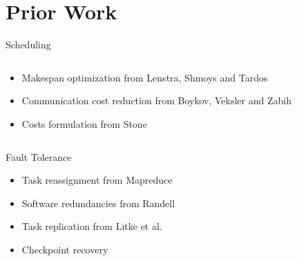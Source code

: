 \documentclass{beamer}
\begin{document}
\section{Prior Work}

\begin{frame}{Scheduling}
\begin{columns}
\begin{column}{6cm}
\begin{itemize}
	\item Makespan optimization from Lenstra, Shmoys and Tardos \cite{len87}
	\item Communication cost reduction from Boykov, Veksler and Zabih \cite{boy01}
	\item Costs formulation from Stone \cite{sto77}
\end{itemize}
\end{column}
\begin{column}{4cm}
\end{column}
\end{columns}
\end{frame}

\begin{frame}{Fault Tolerance}
\begin{itemize}
	\item Task reassignment from Mapreduce \cite{dea08}
	\item Software redundancies from Randell \cite{ran75}
	\item Task replication from Litke et al. \cite{lit07}
	\item Checkpoint recovery \cite{ree06}
\end{itemize}
\end{frame}
\end{document}
